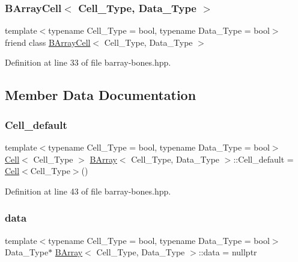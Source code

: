 \subsubsection{\texorpdfstring{B\+Array\+Cell$<$ Cell\+\_\+\+Type, Data\+\_\+\+Type $>$}{BArrayCell< Cell\_Type, Data\_Type >}}
{\footnotesize\ttfamily template$<$typename Cell\+\_\+\+Type = bool, typename Data\+\_\+\+Type = bool$>$ \\
friend class \hyperlink{class_b_array_cell}{B\+Array\+Cell}$<$ Cell\+\_\+\+Type, Data\+\_\+\+Type $>$\hspace{0.3cm}{\ttfamily [friend]}}



Definition at line 33 of file barray-\/bones.\+hpp.



\subsection{Member Data Documentation}
\mbox{\label{class_b_array_a5700cd9bb3814f84c62dda0ea47931bc}} 
\subsubsection{\texorpdfstring{Cell\+\_\+default}{Cell\_default}}
{\footnotesize\ttfamily template$<$typename Cell\+\_\+\+Type = bool, typename Data\+\_\+\+Type = bool$>$ \\
\hyperlink{class_cell}{Cell}$<$ Cell\+\_\+\+Type $>$ \hyperlink{class_b_array}{B\+Array}$<$ Cell\+\_\+\+Type, Data\+\_\+\+Type $>$\+::Cell\+\_\+default = \hyperlink{class_cell}{Cell}$<$Cell\+\_\+\+Type$>$()\hspace{0.3cm}{\ttfamily [static]}}



Definition at line 43 of file barray-\/bones.\+hpp.

\mbox{\label{class_b_array_a9576163b52124021575e50dbcca2f6b9}} 
\subsubsection{\texorpdfstring{data}{data}}
{\footnotesize\ttfamily template$<$typename Cell\+\_\+\+Type = bool, typename Data\+\_\+\+Type = bool$>$ \\
Data\+\_\+\+Type$\ast$ \hyperlink{class_b_array}{B\+Array}$<$ Cell\+\_\+\+Type, Data\+\_\+\+Type $>$\+::data = nullptr}



